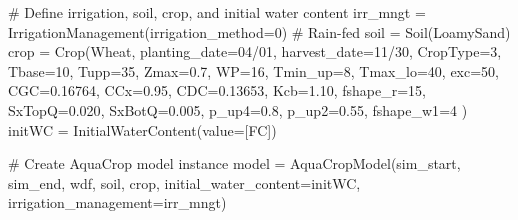 \documentclass[
  letterpaper,
  DIV=11,
  numbers=noendperiod]{scrartcl}
\newenvironment{Shaded}{\begin{snugshade}}{\end{snugshade}}
\newcommand{\CommentTok}[1]{\textcolor[rgb]{0.37,0.37,0.37}{#1}}
\newcommand{\DecValTok}[1]{\textcolor[rgb]{0.68,0.00,0.00}{#1}}
\newcommand{\FloatTok}[1]{\textcolor[rgb]{0.68,0.00,0.00}{#1}}
\newcommand{\NormalTok}[1]{\textcolor[rgb]{0.00,0.23,0.31}{#1}}
\newcommand{\OperatorTok}[1]{\textcolor[rgb]{0.37,0.37,0.37}{#1}}
\newcommand{\StringTok}[1]{\textcolor[rgb]{0.13,0.47,0.30}{#1}}
\begin{document}
\begin{Shaded}
\begin{Highlighting}[]
    \CommentTok{\# Define irrigation, soil, crop, and initial water content}
\NormalTok{    irr\_mngt }\OperatorTok{=}\NormalTok{ IrrigationManagement(irrigation\_method}\OperatorTok{=}\DecValTok{0}\NormalTok{)  }\CommentTok{\# Rain{-}fed}
\NormalTok{    soil }\OperatorTok{=}\NormalTok{ Soil(}\StringTok{\textquotesingle{}LoamySand\textquotesingle{}}\NormalTok{)}
\NormalTok{    crop }\OperatorTok{=}\NormalTok{ Crop(}\StringTok{\textquotesingle{}Wheat\textquotesingle{}}\NormalTok{,}
\NormalTok{                planting\_date}\OperatorTok{=}\StringTok{\textquotesingle{}04/01\textquotesingle{}}\NormalTok{,}
\NormalTok{                harvest\_date}\OperatorTok{=}\StringTok{\textquotesingle{}11/30\textquotesingle{}}\NormalTok{,}
\NormalTok{                CropType}\OperatorTok{=}\DecValTok{3}\NormalTok{,}
\NormalTok{                Tbase}\OperatorTok{=}\DecValTok{10}\NormalTok{,}
\NormalTok{                Tupp}\OperatorTok{=}\DecValTok{35}\NormalTok{,}
\NormalTok{                Zmax}\OperatorTok{=}\FloatTok{0.7}\NormalTok{,}
\NormalTok{                WP}\OperatorTok{=}\DecValTok{16}\NormalTok{,}
\NormalTok{                Tmin\_up}\OperatorTok{=}\DecValTok{8}\NormalTok{,}
\NormalTok{                Tmax\_lo}\OperatorTok{=}\DecValTok{40}\NormalTok{,}
\NormalTok{                exc}\OperatorTok{=}\DecValTok{50}\NormalTok{,}
\NormalTok{                CGC}\OperatorTok{=}\FloatTok{0.16764}\NormalTok{,}
\NormalTok{                CCx}\OperatorTok{=}\FloatTok{0.95}\NormalTok{,}
\NormalTok{                CDC}\OperatorTok{=}\FloatTok{0.13653}\NormalTok{,}
\NormalTok{                Kcb}\OperatorTok{=}\FloatTok{1.10}\NormalTok{,}
\NormalTok{                fshape\_r}\OperatorTok{=}\DecValTok{15}\NormalTok{,}
\NormalTok{                SxTopQ}\OperatorTok{=}\FloatTok{0.020}\NormalTok{,}
\NormalTok{                SxBotQ}\OperatorTok{=}\FloatTok{0.005}\NormalTok{,}
\NormalTok{                p\_up4}\OperatorTok{=}\FloatTok{0.8}\NormalTok{,}
\NormalTok{                p\_up2}\OperatorTok{=}\FloatTok{0.55}\NormalTok{,}
\NormalTok{                fshape\_w1}\OperatorTok{=}\DecValTok{4}
\NormalTok{               )}
\NormalTok{    initWC }\OperatorTok{=}\NormalTok{ InitialWaterContent(value}\OperatorTok{=}\NormalTok{[}\StringTok{\textquotesingle{}FC\textquotesingle{}}\NormalTok{])}

    \CommentTok{\# Create AquaCrop model instance}
\NormalTok{    model }\OperatorTok{=}\NormalTok{ AquaCropModel(sim\_start, sim\_end, wdf, soil, crop, initial\_water\_content}\OperatorTok{=}\NormalTok{initWC, irrigation\_management}\OperatorTok{=}\NormalTok{irr\_mngt)}


\end{Highlighting}
\end{Shaded}
\end{document}
